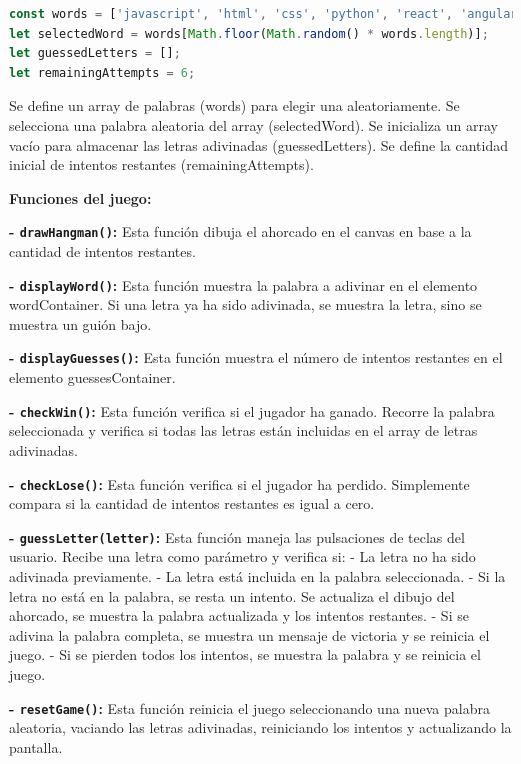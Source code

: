 \begin{lstlisting}[language=JavaScript]
const words = ['javascript', 'html', 'css', 'python', 'react', 'angular', 'vue'];
let selectedWord = words[Math.floor(Math.random() * words.length)];
let guessedLetters = [];
let remainingAttempts = 6;
\end{lstlisting}

Se define un array de palabras (words) para elegir una aleatoriamente. Se selecciona una palabra aleatoria del array (selectedWord). Se inicializa un array vacío para almacenar las letras adivinadas (guessedLetters). Se define la cantidad inicial de intentos restantes (remainingAttempts).

\textbf{Funciones del juego:}

\textbf{- \texttt{drawHangman()}:} Esta función dibuja el ahorcado en el canvas en base a la cantidad de intentos restantes.

\textbf{- \texttt{displayWord()}:} Esta función muestra la palabra a adivinar en el elemento wordContainer. Si una letra ya ha sido adivinada, se muestra la letra, sino se muestra un guión bajo.

\textbf{- \texttt{displayGuesses()}:} Esta función muestra el número de intentos restantes en el elemento guessesContainer.

\textbf{- \texttt{checkWin()}:} Esta función verifica si el jugador ha ganado. Recorre la palabra seleccionada y verifica si todas las letras están incluidas en el array de letras adivinadas.

\textbf{- \texttt{checkLose()}:} Esta función verifica si el jugador ha perdido. Simplemente compara si la cantidad de intentos restantes es igual a cero.

\textbf{- \texttt{guessLetter(letter)}:} Esta función maneja las pulsaciones de teclas del usuario. Recibe una letra como parámetro y verifica si:
  - La letra no ha sido adivinada previamente.
  - La letra está incluida en la palabra seleccionada.
  - Si la letra no está en la palabra, se resta un intento. Se actualiza el dibujo del ahorcado, se muestra la palabra actualizada y los intentos restantes.
  - Si se adivina la palabra completa, se muestra un mensaje de victoria y se reinicia el juego.
  - Si se pierden todos los intentos, se muestra la palabra y se reinicia el juego.

\textbf{- \texttt{resetGame()}:} Esta función reinicia el juego seleccionando una nueva palabra aleatoria, vaciando las letras adivinadas, reiniciando los intentos y actualizando la pantalla.

